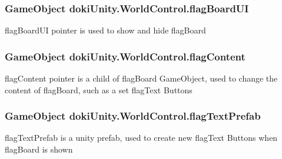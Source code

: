 \subsubsection[{\texorpdfstring{flag\+Board\+UI}{flagBoardUI}}]{\setlength{\rightskip}{0pt plus 5cm}Game\+Object doki\+Unity.\+World\+Control.\+flag\+Board\+UI}\hypertarget{classdoki_unity_1_1_world_control_a99dcc33e772703c54d35cf0afe37bc8d}{}\label{classdoki_unity_1_1_world_control_a99dcc33e772703c54d35cf0afe37bc8d}


flag\+Board\+UI pointer is used to show and hide flag\+Board 

\subsubsection[{\texorpdfstring{flag\+Content}{flagContent}}]{\setlength{\rightskip}{0pt plus 5cm}Game\+Object doki\+Unity.\+World\+Control.\+flag\+Content}\hypertarget{classdoki_unity_1_1_world_control_aedd97c791d102d3e9c71fc774403d5cc}{}\label{classdoki_unity_1_1_world_control_aedd97c791d102d3e9c71fc774403d5cc}


flag\+Content pointer is a child of flag\+Board Game\+Object, used to change the content of flag\+Board, such as a set flag\+Text Buttons 

\subsubsection[{\texorpdfstring{flag\+Text\+Prefab}{flagTextPrefab}}]{\setlength{\rightskip}{0pt plus 5cm}Game\+Object doki\+Unity.\+World\+Control.\+flag\+Text\+Prefab}\hypertarget{classdoki_unity_1_1_world_control_a60f26fb8915ffa6d19a9811fb782b7ab}{}\label{classdoki_unity_1_1_world_control_a60f26fb8915ffa6d19a9811fb782b7ab}


flag\+Text\+Prefab is a unity prefab, used to create new flag\+Text Buttons when flag\+Board is shown 

